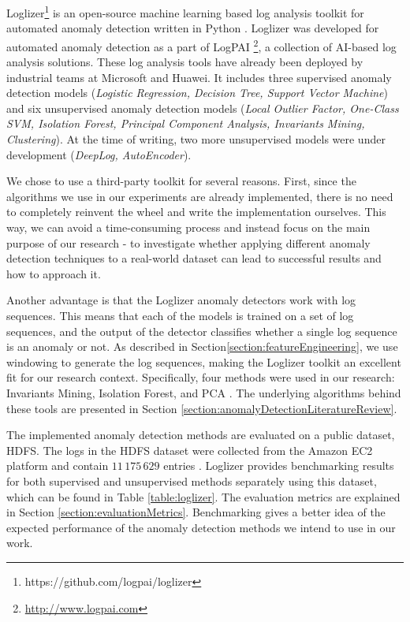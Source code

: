 Loglizer\footnote{https://github.com/logpai/loglizer} is an open-source machine learning based log analysis toolkit for automated anomaly detection written in Python \cite{he2016}. Loglizer was developed for automated anomaly detection as a part of LogPAI \footnote{\url{http://www.logpai.com}}, a collection of AI-based log analysis solutions. These log analysis tools have already been deployed by industrial teams at Microsoft and Huawei. It includes three supervised anomaly detection models (\textit{Logistic Regression, Decision Tree, Support Vector Machine}) and six unsupervised anomaly detection models (\textit{Local Outlier Factor, One-Class SVM, Isolation Forest, Principal Component Analysis, Invariants Mining, Clustering}). At the time of writing, two more unsupervised models were under development (\textit{DeepLog, AutoEncoder}). 

We chose to use a third-party toolkit for several reasons. First, since the algorithms we use in our experiments are already implemented, there is no need to completely reinvent the wheel and write the implementation ourselves. This way, we can avoid a time-consuming process and instead focus on the main purpose of our research - to investigate whether applying different anomaly detection techniques to a real-world dataset can lead to successful results and how to approach it.

Another advantage is that the Loglizer anomaly detectors work with log sequences. This means that each of the models is trained on a set of log sequences, and the output of the detector classifies whether a single log sequence is an anomaly or not. As described in Section\ref{section:featureEngineering}, we use windowing to generate the log sequences, making the Loglizer toolkit an excellent fit for our research context. Specifically, four methods were used in our research: Invariants Mining, Isolation Forest, and PCA . The underlying algorithms behind these tools are presented in Section \ref{section:anomalyDetectionLiteratureReview}.

The implemented anomaly detection methods are evaluated on a public dataset, HDFS. The logs in the HDFS dataset were collected from the Amazon EC2 platform and contain $11\,175\,629$ entries \cite{xu2009}. Loglizer provides benchmarking results for both supervised and unsupervised methods separately using this dataset, which can be found in Table \ref{table:loglizer}. The evaluation metrics are explained in Section \ref{section:evaluationMetrics}. Benchmarking gives a better idea of the expected performance of the anomaly detection methods we intend to use in our work.  

